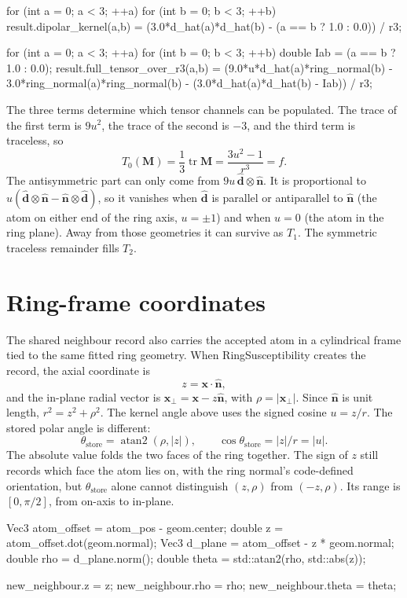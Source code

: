 \documentclass[11pt]{article}
\begin{document}
\begin{codebox}
for (int a = 0; a < 3; ++a)
    for (int b = 0; b < 3; ++b)
        result.dipolar_kernel(a,b) =
            (3.0*d_hat(a)*d_hat(b) - (a == b ? 1.0 : 0.0)) / r3;

for (int a = 0; a < 3; ++a) {
    for (int b = 0; b < 3; ++b) {
        double Iab = (a == b ? 1.0 : 0.0);
        result.full_tensor_over_r3(a,b) =
            (9.0*u*d_hat(a)*ring_normal(b)
             - 3.0*ring_normal(a)*ring_normal(b)
             - (3.0*d_hat(a)*d_hat(b) - Iab)) / r3;
    }
}
\end{codebox}

The three terms determine which tensor channels can be populated. The trace of
the first term is \(9u^2\), the trace of the second is \(-3\), and the
third term is traceless, so
\[
  T_0(\bm M)=\frac{1}{3}\operatorname{tr}\bm M
            =\frac{3u^2-1}{r^3}=f .
\]
The antisymmetric part can only come from
\(9u\,\hat{\bm d}\otimes\hat{\bm n}\). It is proportional to
\(u(\hat{\bm d}\otimes\hat{\bm n}
-\hat{\bm n}\otimes\hat{\bm d})\), so it vanishes when \(\hat{\bm d}\) is
parallel or antiparallel to \(\hat{\bm n}\) (the atom on either end of the ring
axis, \(u=\pm1\)) and when \(u=0\) (the atom in the ring plane). Away from those
geometries it can survive as \(T_1\). The symmetric traceless remainder fills
\(T_2\).

\section{Ring-frame coordinates}

The shared neighbour record also carries the accepted atom in a cylindrical
frame tied to the same fitted ring geometry. When RingSusceptibility creates
the record, the axial coordinate is
\[
  z=\bm x\cdot\hat{\bm n},
\]
and the in-plane radial vector is
\(\bm x_\perp=\bm x-z\hat{\bm n}\), with \(\rho=|\bm x_\perp|\). Since
\(\hat{\bm n}\) is unit length, \(r^2=z^2+\rho^2\). The kernel angle above uses
the signed cosine \(u=z/r\). The stored polar angle is different:
\[
  \theta_{\mathrm{store}}=\operatorname{atan2}(\rho,|z|),
  \qquad
  \cos\theta_{\mathrm{store}}=|z|/r=|u|.
\]
The absolute value folds the two faces of the ring together. The sign of \(z\)
still records which face the atom lies on, with the ring normal's code-defined
orientation, but \(\theta_{\mathrm{store}}\) alone cannot distinguish
\((z,\rho)\) from \((-z,\rho)\). Its range is \([0,\pi/2]\), from on-axis to
in-plane.

\begin{codebox}
Vec3 atom_offset = atom_pos - geom.center;
double z = atom_offset.dot(geom.normal);
Vec3 d_plane = atom_offset - z * geom.normal;
double rho = d_plane.norm();
double theta = std::atan2(rho, std::abs(z));

new_neighbour.z = z;
new_neighbour.rho = rho;
new_neighbour.theta = theta;
\end{codebox}
\end{document}
